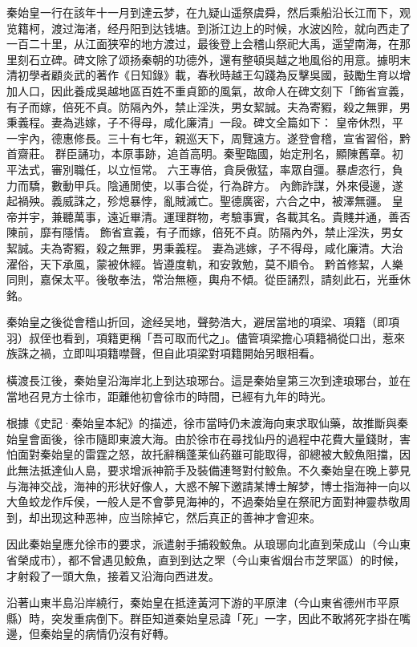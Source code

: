秦始皇一行在該年十一月到達云梦，在九疑山遥祭虞舜，然后乘船沿长江而下，观览籍柯，渡过海渚，经丹阳到达钱塘。到浙江边上的时候，水波凶险，就向西走了一百二十里，从江面狭窄的地方渡过，最後登上会稽山祭祀大禹，遥望南海，在那里刻石立碑。碑文除了颂扬秦朝的功德外，還有整頓吳越之地風俗的用意。據明末清初學者顧炎武的著作《日知錄》載，春秋時越王勾踐為反擊吳國，鼓勵生育以增加人口，因此養成吳越地區百姓不重貞節的風氣，故命人在碑文刻下「飾省宣義，有子而嫁，倍死不貞。防隔內外，禁止淫泆，男女絜誠。夫為寄豭，殺之無罪，男秉義程。妻為逃嫁，子不得母，咸化廉清」一段。碑文全篇如下：
皇帝休烈，平一宇內，德惠修長。三十有七年，親巡天下，周覽遠方。遂登會稽，宣省習俗，黔首齋莊。
群臣誦功，本原事跡，追首高明。秦聖臨國，始定刑名，顯陳舊章。初平法式，審別職任，以立恒常。
六王專倍，貪戾傲猛，率眾自彊。暴虐恣行，負力而驕，數動甲兵。陰通閒使，以事合從，行為辟方。
內飾詐謀，外來侵邊，遂起禍殃。義威誅之，殄熄暴悖，亂賊滅亡。聖德廣密，六合之中，被澤無疆。
皇帝并宇，兼聽萬事，遠近畢清。運理群物，考驗事實，各載其名。貴賤并通，善否陳前，靡有隱情。
飾省宣義，有子而嫁，倍死不貞。防隔內外，禁止淫泆，男女絜誠。夫為寄豭，殺之無罪，男秉義程。
妻為逃嫁，子不得母，咸化廉清。大治濯俗，天下承風，蒙被休經。皆遵度軌，和安敦勉，莫不順令。
黔首修絜，人樂同則，嘉保太平。後敬奉法，常治無極，輿舟不傾。從臣誦烈，請刻此石，光垂休銘。

秦始皇之後從會稽山折回，途经吴地，聲勢浩大，避居當地的項梁、項籍（即項羽）叔侄也看到，項籍更稱「吾可取而代之」。儘管項梁擔心項籍禍從口出，惹來族誅之禍，立即叫項籍噤聲，但自此項梁對項籍開始另眼相看。

橫渡長江後，秦始皇沿海岸北上到达琅琊台。這是秦始皇第三次到達琅琊台，並在當地召見方士徐巿，距離他初會徐巿的時間，已經有九年的時光。

根據《史記·秦始皇本紀》的描述，徐巿當時仍未渡海向東求取仙藥，故推斷與秦始皇會面後，徐巿隨即東渡大海。由於徐巿在尋找仙丹的過程中花費大量錢財，害怕面對秦始皇的雷霆之怒，故托辭稱蓬莱仙药雖可能取得，卻總被大鮫魚阻擋，因此無法抵達仙人島，要求增派神箭手及裝備連弩對付鮫魚。不久秦始皇在晚上夢見与海神交战，海神的形状好像人，大惑不解下邀請某博士解梦，博士指海神一向以大鱼蛟龙作斥侯，一般人是不會夢見海神的，不過秦始皇在祭祀方面對神靈恭敬周到，却出现这种恶神，应当除掉它，然后真正的善神才會迎來。

因此秦始皇應允徐巿的要求，派遣射手捕殺鮫魚。从琅琊向北直到荣成山（今山東省榮成市），都不曾遇见鮫魚，直到到达之罘（今山東省烟台市芝罘區）的时候，才射殺了一頭大魚，接着又沿海向西进发。

沿著山東半島沿岸繞行，秦始皇在抵逹黃河下游的平原津（今山東省德州市平原縣）時，突发重病倒下。群臣知道秦始皇忌諱「死」一字，因此不敢將死字掛在嘴邊，但秦始皇的病情仍沒有好轉。

